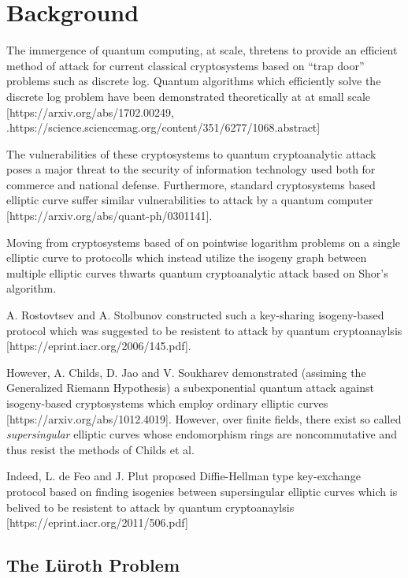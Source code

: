 \documentclass[12pt]{amsart}
\begin{document}
\thispagestyle{fancy}

\section*{Background}

The immergence of quantum computing, at scale, thretens to provide an efficient method of attack for current classical cryptosystems based on ``trap door'' problems such as discrete log. Quantum algorithms which efficiently solve the discrete log problem have been demonstrated theoretically at at small scale [https://arxiv.org/abs/1702.00249, .https://science.sciencemag.org/content/351/6277/1068.abstract]

The vulnerabilities of these cryptosystems to quantum cryptoanalytic attack poses a major threat to the security of information technology used both for commerce and national defense. Furthermore, standard cryptosystems based elliptic curve suffer similar vulnerabilities to attack by a quantum computer [https://arxiv.org/abs/quant-ph/0301141].

Moving from cryptosystems based of on pointwise logarithm problems on a single elliptic curve to protocolls which instead utilize the isogeny graph between multiple elliptic curves thwarts quantum cryptoanalytic attack based on Shor's algorithm. 

A. Rostovtsev and A. Stolbunov constructed such a key-sharing isogeny-based protocol which was suggested to be resistent to attack by quantum cryptoanaylsis [https://eprint.iacr.org/2006/145.pdf]. 

However, A. Childs, D. Jao and V. Soukharev demonstrated (assiming the Generalized Riemann Hypothesis) a subexponential quantum attack against isogeny-based cryptosystems which employ ordinary elliptic curves [https://arxiv.org/abs/1012.4019]. However, over finite fields, there exist so called \textit{supersingular} elliptic curves whose endomorphism rings are noncommutative and thus resist the methods of Childs et al. 

Indeed, L. de Feo and J. Plut proposed Diffie-Hellman type key-exchange protocol based on finding isogenies between supersingular elliptic curves which is belived to be resistent to attack by quantum cryptoanaylsis [https://eprint.iacr.org/2011/506.pdf]


\subsection*{The L\"{u}roth Problem}
\end{document}
